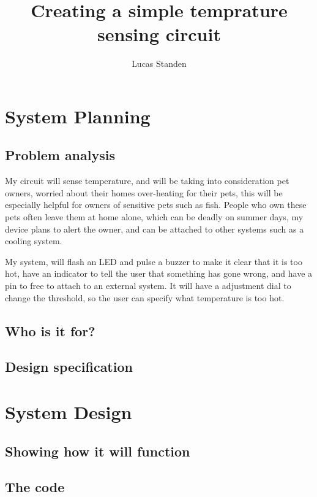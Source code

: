 \documentclass[a4paper,12pt]{article}
\author{Lucas Standen}
\title{Creating a simple temprature sensing circuit}
\begin{document}
\maketitle

\newpage

\tableofcontents
\newpage

\setlength{\parskip}{1em}

{\setlength{\parindent}{0cm}

\section{System Planning}
\subsection{Problem analysis}
My circuit will sense temperature, and will be taking into consideration pet owners, worried about 
their homes over-heating for their pets, this will be especially helpful for owners of sensitive pets 
such as fish. People who own these pets often leave them at home alone, which can be deadly on summer 
days, my device plans to alert the owner, and can be attached to other systems such as a cooling system. 

My system, will flash an LED and pulse a buzzer to make it clear that it is too hot, have an indicator 
to tell the user that something has gone wrong, and have a pin to free to attach to an external system.
It will have a adjustment dial to change the threshold, so the user can specify what temperature is too
hot.

\subsection{Who is it for?}
\subsection{Design specification}

\section{System Design}
\subsection{Showing how it will function}
\subsection{The code}

}
\end{document}
